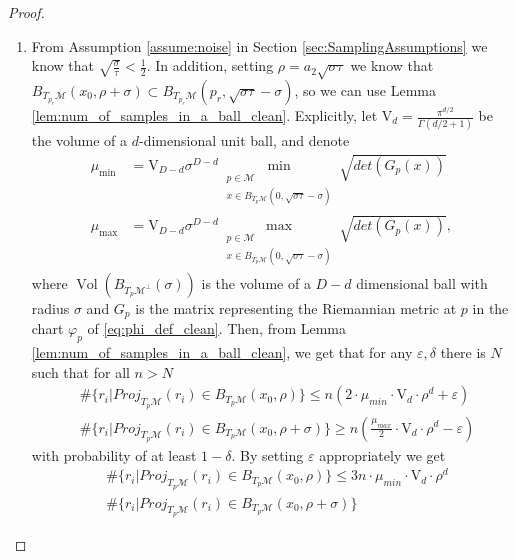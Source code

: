 \documentclass[12pt]{article}
\theoremstyle{remark}
\newcommand{\MM}{\mathcal{M}}
\newcommand{\eps}{\varepsilon}
\newcommand{\lrangle}[1]{\langle #1 \rangle}
\DeclareMathOperator{\vol}{Vol}
\begin{document}
\begin{appendices}
\begin{proof}
\begin{enumerate}
    \begin{equation}\label{eq:ri_tyk_bound_clean}
        \lrangle{r_i - {p_r}, \tilde y_j}^2 \geq \frac{1}{64}\sigma \tau sin\alpha - \frac{1}{2}\sigma^{3/2}\tau^{1/2}
    .\end{equation}
    This is proven in \ref{subsec:proof_lem_ri_tyk_bound_clean}.
    \item\label{thm:claim_useStochasticLemma} From Assumption \ref{assume:noise} in Section \ref{sec:SamplingAssumptions} we know that $ \sqrt{\frac{\sigma}{\tau}} < \frac{1}{2} $. 
    In addition, setting $ \rho = a_2 \sqrt{\sigma \tau} $ we know that $ B_{T_{p_r}\MM}(x_0, \rho+\sigma)\subset B_{T_{p_r}\MM}({p_r}, \sqrt{\sigma \tau} - \sigma) $, so we can use Lemma \ref{lem:num_of_samples_in_a_ball_clean}.
    Explicitly, let $\mathrm{V}_d = \frac{\pi^{d/2}}{\Gamma(d/2+1)}$ be the volume of a $ d $-dimensional unit ball, and denote 
     \begin{align*}
    \mu_{\min} &= \mathrm{V}_{D-d}\sigma^{D-d} \min_{\substack{p\in \MM\\ x\in B_{T_p\MM}(0,\sqrt{\sigma\tau}- \sigma)}}  \sqrt{det(G_p(x))}\\
    \mu_{\max} &= \mathrm{V}_{D-d}\sigma^{D-d}\max_{\substack{p\in \MM \\ x \in B_{T_p\MM}(0,\sqrt{\sigma\tau}- \sigma)}}  \sqrt{det(G_p(x))}
    ,
    \end{align*}
    where $ \vol(B_{{T_p\MM}^\perp}(\sigma)) $ is the volume of a $ D-d $ dimensional ball with radius $ \sigma $ and $ G_p $ is the matrix representing the Riemannian metric at $ p $ in the chart $ \varphi_p $ of \eqref{eq:phi_def_clean}.
    Then, from Lemma \ref{lem:num_of_samples_in_a_ball_clean}, we get that for any $ \eps, \delta $ there is $ N $ such that for all $ n > N $
    \begin{align*}
    &\#\{r_i|Proj_{T_p\MM}(r_i) \in B_{T_p\MM}(x_0,\rho) \}
    \leq
    n(2\cdot \mu_{min}\cdot \mathrm{V}_d \cdot\rho^d+\eps) \\
    &\#\{r_i|Proj_{T_p\MM}(r_i) \in B_{T_p\MM}(x_0,\rho+\sigma) \}
    \geq
    n \left(\frac{\mu_{max}}{2}\cdot \mathrm{V}_{d}\cdot \rho^d - \eps\right)
    \end{align*}
    with probability of at least $1-\delta$.
    By setting $ \eps $ appropriately we get 
    \begin{align*}
    &\#\{r_i|Proj_{T_p\MM}(r_i) \in B_{T_p\MM}(x_0,\rho) \}
    \leq
    3 n \cdot\mu_{min}\cdot \mathrm{V}_d \cdot\rho^d \\
    &\#\{r_i|Proj_{T_p\MM}(r_i) \in B_{T_p\MM}(x_0,\rho+\sigma) \}

\end{align*}
\end{enumerate}
\end{proof}
\end{appendices}
\end{document}
